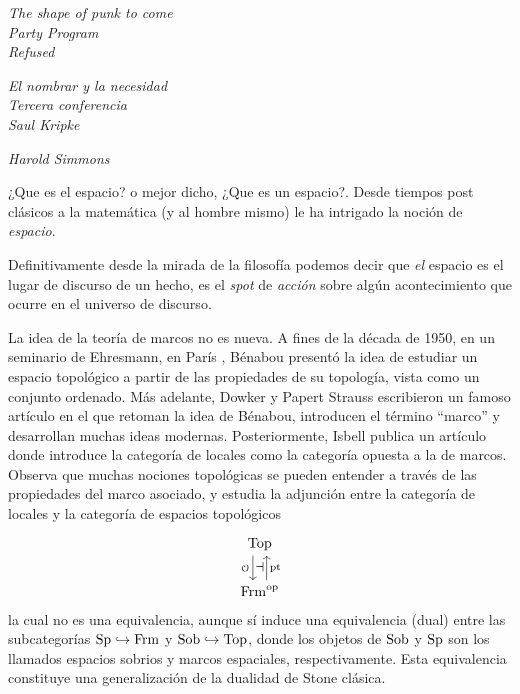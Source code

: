 
\begin{epigraphs}
\footnotesize{}
{\emph{ The shape of punk to come\\
Party Program\\
Refused}}
\normalsize\end{epigraphs}


\begin{epigraphs}
    \footnotesize{}
    {\emph{ El nombrar y la necesidad\\
    Tercera conferencia\\
    Saul Kripke}}
    \normalsize\end{epigraphs}

    \begin{epigraphs}
        \footnotesize{}
        {\emph{ 
        Harold Simmons}}
        \normalsize\end{epigraphs}
¿Que es el espacio? o mejor dicho,
¿Que es un espacio?.
Desde tiempos post clásicos a la matemática (y al hombre mismo) le ha intrigado la
noción de \emph{espacio}.

Definitivamente desde la mirada de la filosofía podemos decir que 
\emph{el} espacio es el lugar de discurso de un hecho, es el \emph{spot}
de \emph{acción} sobre algún acontecimiento que ocurre en el universo de discurso.






La idea de la teoría de marcos no es nueva.
A fines de la década de 1950, en un seminario de Ehresmann,
en París \cite{Gattungen}, Bénabou
presentó la idea de estudiar un espacio topológico a partir
de las propiedades de su topología, vista como un conjunto ordenado.
Más adelante, Dowker y Papert Strauss escribieron un famoso artículo
\cite{Quotients}
en el que retoman la idea de Bénabou, introducen el término ``marco''
y desarrollan muchas ideas modernas.
Posteriormente, Isbell publica un artículo \cite{atomless-parts}
donde introduce
la categoría de locales como la categoría opuesta a la de marcos.
Observa que muchas nociones topológicas se pueden entender
a través de las propiedades del marco asociado,
y estudia la adjunción entre la categoría de locales y la categoría
de espacios topológicos
\[
    \begin{tikzcd}
        \Top \ar[d,"\cal O"'{name=izq},shift right=2] \\
        \Frm^\op \ar[u,"\pt"'{name=der},shift right=2]
        \adj{izq}{der}
    \end{tikzcd}
\]
la cual no es una equivalencia,
aunque sí induce una equivalencia (dual) entre las subcategorías
$\mathrm{Sp}\hookrightarrow\mathrm{Frm}$ y $\mathrm{Sob}\hookrightarrow\mathrm{Top}$,
donde los objetos de $\mathrm{Sob}$ y $\mathrm{Sp}$ son los llamados espacios sobrios
y marcos espaciales, respectivamente.
Esta equivalencia constituye una generalización de la dualidad
de Stone clásica.

